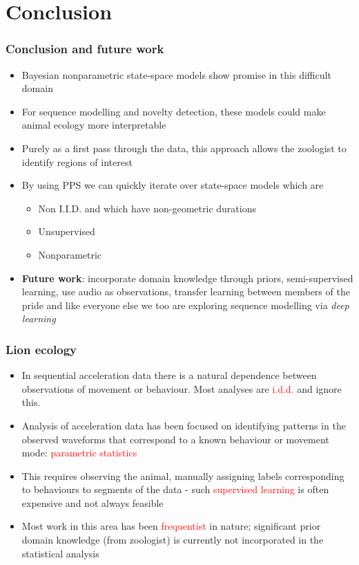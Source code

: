 \documentclass[aspectratio=169]{beamer}
\begin{document}
    \section{Conclusion}
    \begin{frame}
        \frametitle{Conclusion and future work}
        \begin{itemize}
            \item Bayesian nonparametric state-space models show promise in this difficult domain 
            \item For sequence modelling and novelty detection, these models could make animal ecology more interpretable
            \item Purely as a first pass through the data, this approach allows the zoologist to identify regions of interest
            \item By using PPS we can quickly iterate over state-space models which are 
                \begin{itemize}
                    \item Non I.I.D.  and which have non-geometric durations
                    \item Unsupervised
                    \item Nonparametric
                \end{itemize}
            \item {\bf Future work}: incorporate domain knowledge through priors, semi-supervised learning, use audio as observations, transfer learning between members of the pride and like everyone else we too are exploring sequence modelling via \emph{deep learning} 
        \end{itemize}
    \end{frame}


    \iffalse %
    \begin{frame}
        \frametitle{Lion ecology}

        \begin{itemize}
            \item In sequential acceleration data there is a natural dependence between observations of movement or behaviour. Most analyses are \textcolor{red}{i.d.d.} and ignore this.
            \item Analysis of acceleration data
                has been focused on identifying patterns in the observed waveforms that correspond to a known behaviour or movement mode: \textcolor{red}{parametric statistics}
            \item This requires observing the animal, manually assigning labels corresponding to behaviours to segments of the data - such \textcolor{red}{supervised learning} is often expensive and not always feasible
            \item Most work in this area has been \textcolor{red}{frequentist} in nature; significant prior domain knowledge (from zoologist) is currently not incorporated in the statistical analysis
        \end{itemize}

    \end{frame}
\end{document}
